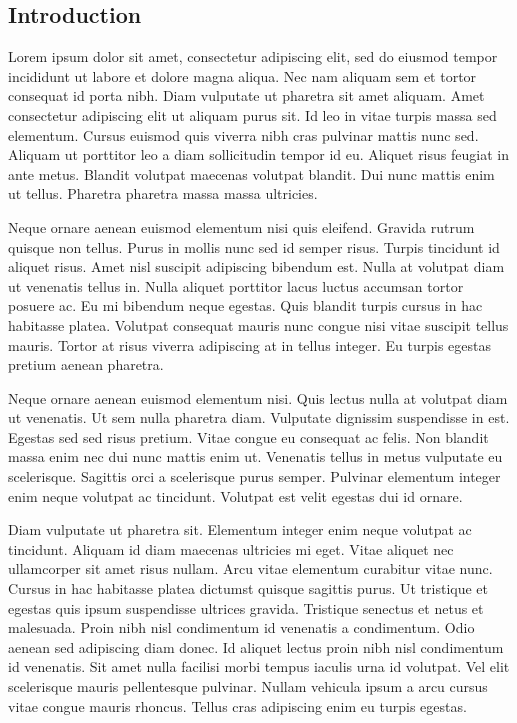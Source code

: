 \begin{doublespace}

\chapter{Introduction}
\end{doublespace}

Lorem ipsum dolor sit amet, consectetur adipiscing elit, sed do eiusmod
tempor incididunt ut labore et dolore magna aliqua. Nec nam aliquam
sem et tortor consequat id porta nibh. Diam vulputate ut pharetra
sit amet aliquam. Amet consectetur adipiscing elit ut aliquam purus
sit. Id leo in vitae turpis massa sed elementum. Cursus euismod quis
viverra nibh cras pulvinar mattis nunc sed. Aliquam ut porttitor leo
a diam sollicitudin tempor id eu. Aliquet risus feugiat in ante metus.
Blandit volutpat maecenas volutpat blandit. Dui nunc mattis enim ut
tellus. Pharetra pharetra massa massa ultricies.

Neque ornare aenean euismod elementum nisi quis eleifend. Gravida
rutrum quisque non tellus. Purus in mollis nunc sed id semper risus.
Turpis tincidunt id aliquet risus. Amet nisl suscipit adipiscing bibendum
est. Nulla at volutpat diam ut venenatis tellus in. Nulla aliquet
porttitor lacus luctus accumsan tortor posuere ac. Eu mi bibendum
neque egestas. Quis blandit turpis cursus in hac habitasse platea.
Volutpat consequat mauris nunc congue nisi vitae suscipit tellus mauris.
Tortor at risus viverra adipiscing at in tellus integer. Eu turpis
egestas pretium aenean pharetra.

Neque ornare aenean euismod elementum nisi. Quis lectus nulla at volutpat
diam ut venenatis. Ut sem nulla pharetra diam. Vulputate dignissim
suspendisse in est. Egestas sed sed risus pretium. Vitae congue eu
consequat ac felis. Non blandit massa enim nec dui nunc mattis enim
ut. Venenatis tellus in metus vulputate eu scelerisque. Sagittis orci
a scelerisque purus semper. Pulvinar elementum integer enim neque
volutpat ac tincidunt. Volutpat est velit egestas dui id ornare.

Diam vulputate ut pharetra sit. Elementum integer enim neque volutpat
ac tincidunt. Aliquam id diam maecenas ultricies mi eget. Vitae aliquet
nec ullamcorper sit amet risus nullam. Arcu vitae elementum curabitur
vitae nunc. Cursus in hac habitasse platea dictumst quisque sagittis
purus. Ut tristique et egestas quis ipsum suspendisse ultrices gravida.
Tristique senectus et netus et malesuada. Proin nibh nisl condimentum
id venenatis a condimentum. Odio aenean sed adipiscing diam donec.
Id aliquet lectus proin nibh nisl condimentum id venenatis. Sit amet
nulla facilisi morbi tempus iaculis urna id volutpat. Vel elit scelerisque
mauris pellentesque pulvinar. Nullam vehicula ipsum a arcu cursus
vitae congue mauris rhoncus. Tellus cras adipiscing enim eu turpis
egestas.

